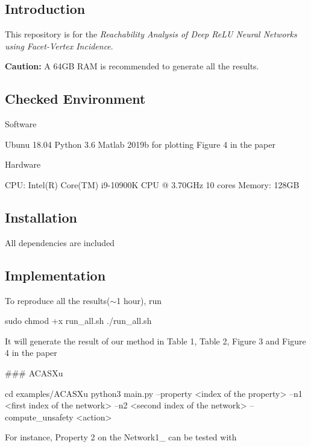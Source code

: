 \subsection*{Introduction}

This repository is for the {\itshape Reachability Analysis of Deep Re\+LU Neural Networks using Facet-\/\+Vertex Incidence}.

{\bfseries Caution\+:} A 64\+GB R\+AM is recommended to generate all the results.

\subsection*{Checked Environment}

Software


\begin{DoxyCode}
Ubunu 18.04
Python 3.6
Matlab 2019b \textcolor{keywordflow}{for} plotting Figure 4 in the paper
\end{DoxyCode}


Hardware


\begin{DoxyCode}
CPU: Intel(R) Core(TM) i9-10900K CPU @ 3.70GHz 10 cores
Memory: 128GB
\end{DoxyCode}


\subsection*{Installation}

All dependencies are included

\subsection*{Implementation}

To reproduce all the results($\sim$1 hour), run 
\begin{DoxyCode}
sudo chmod +x run\_all.sh
./run\_all.sh
\end{DoxyCode}
 It will generate the result of our method in Table 1, Table 2, Figure 3 and Figure 4 in the paper

\#\#\# A\+C\+A\+S\+Xu 
\begin{DoxyCode}
cd examples/ACASXu
python3 main.py --property <index of the property> --n1 <first index of the network> --n2 <second index of
       the network> --compute\_unsafety <action>
\end{DoxyCode}
 For instance, Property 2 on the Network1\+\_ can be tested with


